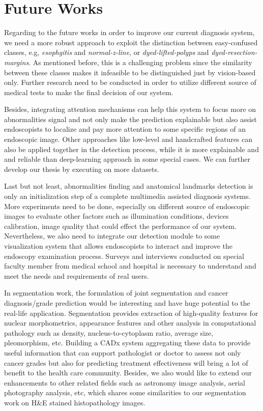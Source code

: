 \section{Future Works}
Regarding to the future works in order to improve our current diagnosis system, we need a more robust approach to exploit the distinction between easy-confused classes, e.g, \textit{esophgitis} and \textit{normal-z-line}, or \textit{dyed-lifted-polyps} and \textit{dyed-resection-margins}. As mentioned before, this is a challenging problem since the similarity between these classes makes it infeasible to be distinguished just by vision-based only. Further research need to be conducted in order to utilize different source of medical tests to make the final decision of our system.

Besides, integrating attention mechanisms can help this system to focus more on abnormalities signal and not only make the prediction explainable but also assist endoscopists to localize and pay more attention to some specific regions of an endoscopic image. Other approaches like low-level and handcrafted features can also be applied together in the detection process, while it is more explainable and and reliable than deep-learning approach in some special cases. We can further develop our thesis by executing on more datasets.

Last but not least, abnormalities finding and anatomical landmarks detection is only an initialization step of a complete multimedia assisted diagnosis systems. More experiments need to be done, especially on different source of endoscopic images to evaluate other factors such as illumination conditions, devices calibration, image quality that could effect the performance of our system. Nevertheless, we also need to integrate our  detection module to some visualization system that allows endoscopists to interact and improve the endoscopy examination process. Surveys and interviews conducted on special  faculty member from medical school and hospital is necessary to understand and meet the needs and requirements of real users.

In segmentation work, the formulation of joint segmentation and cancer diagnosis/grade prediction would be interesting and have huge potential to the real-life application. Segmentation provides extraction of high-quality features for nuclear morphometrics, appearance features and other analysis in computational pathology such as density, nucleus-to-cytoplasm ratio, average size, pleomorphism, etc. Building a CADx system aggregating these data to provide useful information that can support pathologist or doctor to assess not only cancer grades but also for predicting treatment effectiveness will bring a lot of benefit to the health care community. Besides, we also would like to extend our enhancements to other related fields such as astronomy image analysis, aerial photography analysis, etc, which shares some similarities to our segmentation work on H\&E stained histopathology images. 


